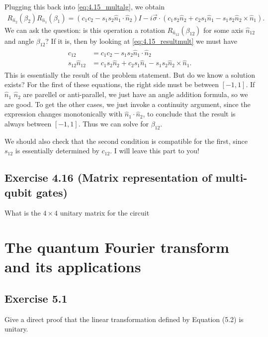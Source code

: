 \documentclass{book}
\begin{document}
    Plugging this back into \eqref{eq:4.15_multalg}, we obtain
    \begin{align} \label{eq:4.15_resultmult}
        R_{\hat{n}_2}(\beta_2)R_{\hat{n}_1}(\beta_1) = (c_1 c_2 - s_1 s_2 \hat{n}_1\cdot \hat{n}_2) I - i \vec{\sigma} \cdot (c_1 s_2 \hat{n}_2 + c_2 s_1 \hat{n}_1 - s_1 s_2 \hat{n}_2 \times \hat{n}_1).
    \end{align}
    We can ask the question: is this operation a rotation $R_{\hat{n}_{12}}(\beta_{12})$ for some axis $\hat{n}_{12}$ and angle $\beta_{12}$? If it is, then by looking at \eqref{eq:4.15_resultmult} we must have
    \begin{align}
    \begin{aligned}
        c_{12} &= c_1 c_2 - s_1 s_2 \hat{n}_1\cdot \hat{n}_2 \\
        s_{12} \hat{n}_{12} &= c_1 s_2 \hat{n}_2 + c_2 s_1 \hat{n}_1 - s_1 s_2 \hat{n}_2 \times \hat{n}_1.
    \end{aligned}
    \end{align}
    This is essentially the result of the problem statement. But do we know a solution exists? For the first of these equations, the right side must be between $[-1,1]$. If $\hat{n}_1$ $\hat{n}_2$ are parellel or anti-parallel, we just have an angle addition formula, so we are good. To get the other cases, we just invoke a continuity argument, since the expression changes monotonically with $\hat{n}_1 \cdot \hat{n}_2$, to conclude that the result is always between $[-1,1]$. Thus we can solve for $\beta_{12}$. 

    We should also check that the second condition is compatible for the first, since $s_{12}$ is essentially determined by $c_{12}$. I will leave this part to you!

\section*{Exercise 4.16 (Matrix representation of multi-qubit gates)}
    What is the $4 \times 4$ unitary matrix for the circuit

\chapter{The quantum Fourier transform and its applications}


\section*{Exercise 5.1}
    Give a direct proof that the linear transformation defined by Equation (5.2) is unitary.
    
\end{document}
